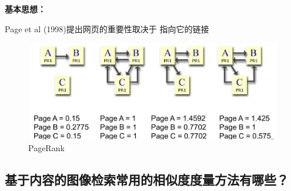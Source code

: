 \documentclass[UTF8,a4paper,AutoFakeBold,AutoFakeSlant]{ctexart}
\begin{document}
\textbf{基本思想：}

Page et al (1998)提出网页的重要性取决于
指向它的链接
\begin{figure}[H]
	\centering
	\includegraphics[scale=0.225]{pagerank.png}
	\caption{PageRank}
	\label{f:pagerank}
\end{figure}



\subsection{基于内容的图像检索常用的相似度度量方法有哪些？}
\end{document}
